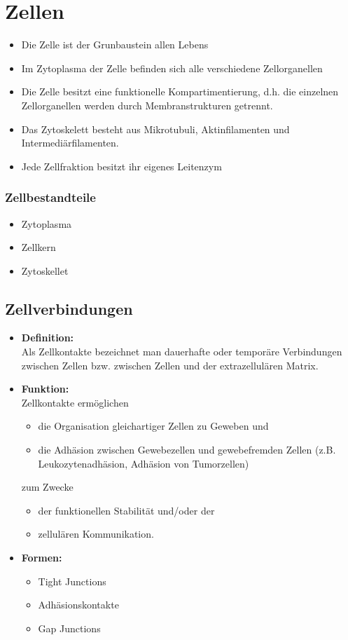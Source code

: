 \documentclass{article}
\begin{document}
\section{Zellen}
\begin{itemize}
    \item Die Zelle ist der Grunbaustein allen Lebens
    \item Im Zytoplasma der Zelle befinden sich alle verschiedene Zellorganellen
    \item Die Zelle besitzt eine funktionelle Kompartimentierung, d.h. die einzelnen Zellorganellen werden durch Membranstrukturen getrennt.
    \item Das Zytoskelett besteht aus Mikrotubuli, Aktinfilamenten und \\ Intermediärfilamenten.
    \item Jede Zellfraktion besitzt ihr eigenes Leitenzym
\end{itemize}
\subsubsection{Zellbestandteile}
\begin{itemize}
    \item Zytoplasma
    \item Zellkern
    \item Zytoskellet
\end{itemize}
\subsection{Zellverbindungen}
\begin{itemize}
    \item \textbf{Definition:} \\
    Als Zellkontakte bezeichnet man dauerhafte oder temporäre Verbindungen zwischen Zellen bzw. zwischen Zellen und der extrazellulären Matrix.
    \item \textbf{Funktion:} \\
    Zellkontakte ermöglichen
    \begin{itemize}
        \item die Organisation gleichartiger Zellen zu Geweben und
        \item die Adhäsion zwischen Gewebezellen und gewebefremden Zellen (z.B. Leukozytenadhäsion, Adhäsion von Tumorzellen)
    \end{itemize}
    zum Zwecke
    \begin{itemize}
        \item der funktionellen Stabilität und/oder der
        \item zellulären Kommunikation.
    \end{itemize}
    \item \textbf{Formen:} 
    \begin{itemize}
        \item Tight Junctions
        \item Adhäsionskontakte
        \item Gap Junctions
    \end{itemize}
\end{itemize}
\newpage
\end{document}
